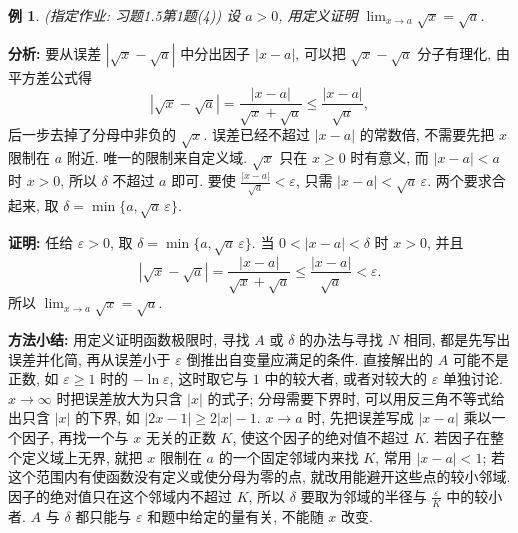 \documentclass[UTF8,openany]{ctexbook}
\theoremstyle{chinesetextbook}
\newtheorem{example}{例}[section]
\newenvironment{cnproof}{\par\indent\textbf{证明:} \ignorespaces}{\par}
\begin{document}
\begin{example}
\textnormal{(指定作业: 习题1.5第1题(4))} 设 $a>0$, 用定义证明 $\displaystyle\lim_{x\to a}\sqrt x=\sqrt a$.
\end{example}
\par\indent\textbf{分析:} 要从误差 $|\sqrt x-\sqrt a|$ 中分出因子 $|x-a|$, 可以把 $\sqrt x-\sqrt a$ 分子有理化, 由平方差公式得
\[
|\sqrt x-\sqrt a|=\frac{|x-a|}{\sqrt x+\sqrt a}\le\frac{|x-a|}{\sqrt a},
\]
后一步去掉了分母中非负的 $\sqrt x$. 误差已经不超过 $|x-a|$ 的常数倍, 不需要先把 $x$ 限制在 $a$ 附近. 唯一的限制来自定义域. $\sqrt x$ 只在 $x\ge0$ 时有意义, 而 $|x-a|<a$ 时 $x>0$, 所以 $\delta$ 不超过 $a$ 即可. 要使 $\displaystyle\frac{|x-a|}{\sqrt a}<\varepsilon$, 只需 $|x-a|<\sqrt a\,\varepsilon$. 两个要求合起来, 取 $\delta=\min\{a,\sqrt a\,\varepsilon\}$.
\begin{cnproof}
任给 $\varepsilon>0$, 取 $\delta=\min\{a,\sqrt a\,\varepsilon\}$. 当 $0<|x-a|<\delta$ 时 $x>0$, 并且
\[
|\sqrt x-\sqrt a|=\frac{|x-a|}{\sqrt x+\sqrt a}\le\frac{|x-a|}{\sqrt a}<\varepsilon.
\]
所以 $\displaystyle\lim_{x\to a}\sqrt x=\sqrt a$.
\end{cnproof}
\par\indent\textbf{方法小结:} 用定义证明函数极限时, 寻找 $A$ 或 $\delta$ 的办法与寻找 $N$ 相同, 都是先写出误差并化简, 再从误差小于 $\varepsilon$ 倒推出自变量应满足的条件. 直接解出的 $A$ 可能不是正数, 如 $\varepsilon\ge1$ 时的 $-\ln\varepsilon$, 这时取它与 $1$ 中的较大者, 或者对较大的 $\varepsilon$ 单独讨论. $x\to\infty$ 时把误差放大为只含 $|x|$ 的式子; 分母需要下界时, 可以用反三角不等式给出只含 $|x|$ 的下界, 如 $|2x-1|\ge2|x|-1$. $x\to a$ 时, 先把误差写成 $|x-a|$ 乘以一个因子, 再找一个与 $x$ 无关的正数 $K$, 使这个因子的绝对值不超过 $K$. 若因子在整个定义域上无界, 就把 $x$ 限制在 $a$ 的一个固定邻域内来找 $K$, 常用 $|x-a|<1$; 若这个范围内有使函数没有定义或使分母为零的点, 就改用能避开这些点的较小邻域. 因子的绝对值只在这个邻域内不超过 $K$, 所以 $\delta$ 要取为邻域的半径与 $\displaystyle\frac\varepsilon K$ 中的较小者. $A$ 与 $\delta$ 都只能与 $\varepsilon$ 和题中给定的量有关, 不能随 $x$ 改变.
\end{document}

